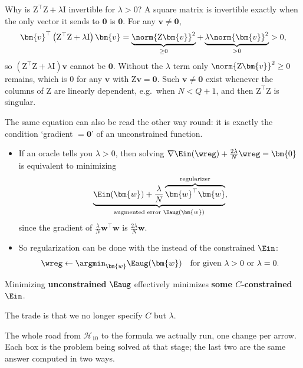 \begin{remark}
    Why is \(\mathrm{Z}^\top \mathrm{Z} + \lambda \mathrm{I}\) invertible for
    \(\lambda > 0\)? A square matrix is invertible exactly when the only
    vector it sends to \(\bm{0}\) is \(\bm{0}\). For any \(\bm{v} \neq \bm{0}\),
    \[
        \bm{v}^\top \left( \mathrm{Z}^\top \mathrm{Z} + \lambda \mathrm{I}
        \right) \bm{v} = \underbrace{\norm{\mathrm{Z} \bm{v}}^2}_{\ge 0} +
        \underbrace{\lambda \norm{\bm{v}}^2}_{> 0} > 0 ,
    \]
    so \(\left( \mathrm{Z}^\top \mathrm{Z} + \lambda \mathrm{I} \right) \bm{v}\)
    cannot be \(\bm{0}\). Without the \(\lambda\) term only \(\norm{\mathrm{Z}
    \bm{v}}^2 \ge 0\) remains, which is \(0\) for any \(\bm{v}\) with
    \(\mathrm{Z} \bm{v} = \bm{0}\). Such \(\bm{v} \neq \bm{0}\) exist whenever
    the columns of \(\mathrm{Z}\) are linearly dependent, e.g.\ when \(N <
    Q + 1\), and then \(\mathrm{Z}^\top \mathrm{Z}\) is singular.
\end{remark}

The same equation can also be read the other way round: it is exactly the
condition `gradient \(= \bm{0}\)' of an unconstrained function.
\begin{itemize}
    \item If an oracle tells you \(\lambda > 0\), then solving
        \(\nabla \Ein(\wreg) + \frac{2\lambda}{N} \wreg = \bm{0}\) is
        equivalent to minimizing
        \[
            \underbrace{\Ein(\bm{w}) + \frac{\lambda}{N} \overbrace{\bm{w}^\top
            \bm{w}}^{\text{regularizer}}}_{\text{augmented error }
            \Eaug(\bm{w})} ,
        \]
        since the gradient of \(\frac{\lambda}{N} \bm{w}^\top \bm{w}\) is
        \(\frac{2\lambda}{N} \bm{w}\).
    \item So regularization can be done with the 
        instead of the constrained \(\Ein\):
        \[
            \wreg \leftarrow \argmin_{\bm{w}} \Eaug(\bm{w}) \quad \text{for
            given } \lambda > 0 \text{ or } \lambda = 0 .
        \]
\end{itemize}

\begin{moral}
    Minimizing \textbf{unconstrained} \(\Eaug\) effectively minimizes
    \textbf{some \(C\)-constrained} \(\Ein\).
\end{moral}

The trade is that we no longer specify \(C\) but \(\lambda\).

The whole road from \(\mathcal{H}_{10}\) to the formula we actually run, one
change per arrow. Each box is the problem being solved at that stage; the
last two are the same answer computed in two ways.


